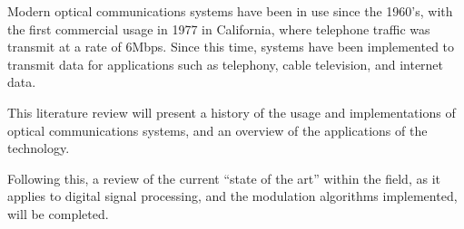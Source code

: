 Modern optical communications systems have been in use since the 1960's, with
the first commercial usage in 1977 in California, where telephone traffic was
transmit at a rate of 6Mbps\cite{alwayn_2004}. Since this time, systems have
been implemented to transmit data for applications such as telephony, cable
television, and internet data.
\par This literature review will present a history of the usage and
implementations of optical communications systems, and an overview of the
applications of the technology.
\par Following this, a review of the current ``state of the art'' within the
field, as it applies to digital signal processing, and the modulation algorithms
implemented, will be completed.
